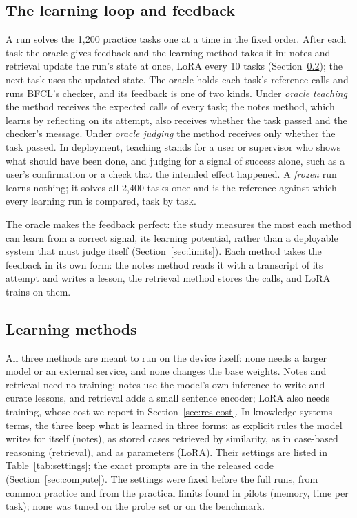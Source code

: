 \documentclass[a4paper,fleqn]{cas-dc}
\begin{document}
\subsection{The learning loop and feedback}\label{sec:loop}
A run solves the 1,200 practice tasks one at a time in the fixed order. After each task the oracle gives feedback and the
learning method takes it in: notes and retrieval update the run's state at once, LoRA every 10 tasks
(Section~\ref{sec:methods}); the next task uses the updated state. The oracle holds each task's reference calls and runs
BFCL's checker, and its feedback is one of two kinds. Under \emph{oracle teaching} the method receives the expected calls
of every task; the notes method, which learns by reflecting on its attempt, also receives whether the task passed and
the checker's message. Under \emph{oracle judging} the method receives only whether the task passed. In deployment,
teaching stands for a user or supervisor who shows what should have been done, and judging for a signal of success
alone, such as a user's confirmation or a check that the intended effect happened. A \emph{frozen} run learns nothing;
it solves all 2,400 tasks once and is the reference against which every learning run is compared, task by task.

The oracle makes the feedback perfect: the study measures the most each method can learn from a correct signal, its
learning potential, rather than a deployable system that must judge itself (Section~\ref{sec:limits}). Each method takes
the feedback in its own form: the notes method reads it with a transcript of its attempt and writes a lesson, the
retrieval method stores the calls, and LoRA trains on them.

\subsection{Learning methods}\label{sec:methods}
All three methods are meant to run on the device itself: none needs a larger model or an external service, and none
changes the base weights. Notes and retrieval need no training: notes use the model's own inference to write and curate lessons, and
retrieval adds a small sentence encoder; LoRA also needs training, whose cost we report in Section~\ref{sec:res-cost}. In
knowledge-systems terms, the three keep what is learned in three forms: as explicit rules the model writes for itself
(notes), as stored cases retrieved by similarity, as in case-based reasoning \citep{aamodt1994case} (retrieval), and as
parameters (LoRA). Their settings are listed in Table~\ref{tab:settings}; the exact prompts are in the released
code (Section~\ref{sec:compute}). The settings were fixed before the full runs, from common practice and from the
practical limits found in pilots (memory, time per task); none was tuned on the probe set or on the benchmark.
\end{document}
